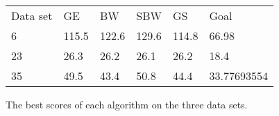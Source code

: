 \begin{figure}
\label{table:pautomac-best-score}
\begin{table}[h]
\begin{tabular}{llllll}
Data set & GE    & BW    & SBW   & GS    & Goal        \\
6        & 115.5 & 122.6 & 129.6 & 114.8 & 66.98       \\
23       & 26.3  & 26.2  & 26.1  & 26.2  & 18.4        \\
35       & 49.5  & 43.4  & 50.8  & 44.4  & 33.77693554
\end{tabular}
\end{table}
\caption{The best scores of each algorithm on the three data sets.}
\end{figure}